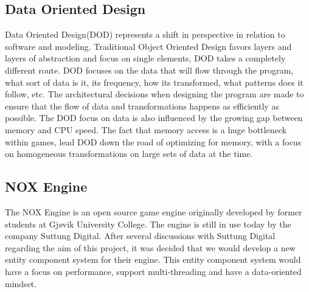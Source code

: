 \subsection*{Data Oriented Design}
Data Oriented Design(DOD) represents a shift in perspective in relation to software and modeling. 
Traditional Object Oriented Design favors layers and layers of abstraction and focus on single elements, 
DOD takes a completely different route. 
DOD focuses on the data that will flow through the program, what sort of data is it, 
its frequency, how its transformed, what patterns does it follow, etc. 
The architectural decisions when designing the program are made to ensure that the flow of data
 and transformations happens as efficiently as possible.
\cite{noel_dod_shoot_in_foot, dod_com} 
The DOD focus on data is also influenced by the growing gap between memory and CPU speed. 
The fact that memory access is a huge bottleneck within games, lead DOD down the road of optimizing for memory, 
with a focus on homogeneous transformations on large sets of data at the time.
\cite{pitfalls_of_oop}

\subsection*{NOX Engine}
The NOX Engine is an open source game engine originally developed by former students at Gj{\o}vik University College.
The engine is still in use today by the company Suttung Digital. 
After several discussions with Suttung Digital regarding the aim of this project, 
it was decided that we would develop a new entity component system for their engine. 
This entity component system would have a focus on performance, 
support multi-threading and have a data-oriented mindset.